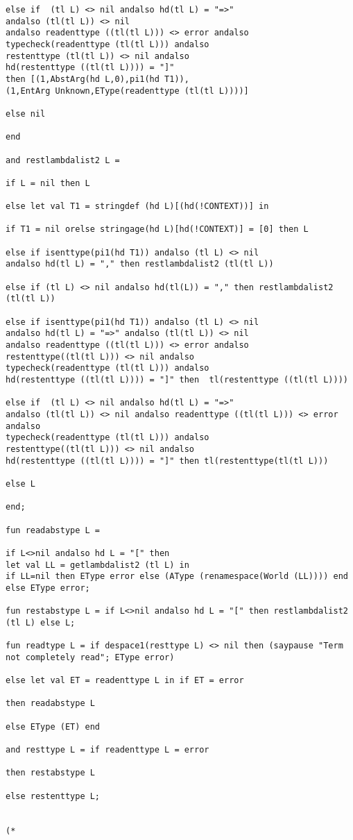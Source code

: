 \documentclass{article}
\begin{document}
\begin{verbatim}
else if  (tl L) <> nil andalso hd(tl L) = "=>" 
andalso (tl(tl L)) <> nil 
andalso readenttype ((tl(tl L))) <> error andalso
typecheck(readenttype (tl(tl L))) andalso
restenttype (tl(tl L)) <> nil andalso
hd(restenttype ((tl(tl L)))) = "]" 
then [(1,AbstArg(hd L,0),pi1(hd T1)),
(1,EntArg Unknown,EType(readenttype (tl(tl L))))]

else nil

end

and restlambdalist2 L =

if L = nil then L

else let val T1 = stringdef (hd L)[(hd(!CONTEXT))] in

if T1 = nil orelse stringage(hd L)[hd(!CONTEXT)] = [0] then L

else if isenttype(pi1(hd T1)) andalso (tl L) <> nil 
andalso hd(tl L) = "," then restlambdalist2 (tl(tl L))

else if (tl L) <> nil andalso hd(tl(L)) = "," then restlambdalist2 (tl(tl L))

else if isenttype(pi1(hd T1)) andalso (tl L) <> nil 
andalso hd(tl L) = "=>" andalso (tl(tl L)) <> nil 
andalso readenttype ((tl(tl L))) <> error andalso
restenttype((tl(tl L))) <> nil andalso
typecheck(readenttype (tl(tl L))) andalso
hd(restenttype ((tl(tl L)))) = "]" then  tl(restenttype ((tl(tl L))))

else if  (tl L) <> nil andalso hd(tl L) = "=>" 
andalso (tl(tl L)) <> nil andalso readenttype ((tl(tl L))) <> error andalso
typecheck(readenttype (tl(tl L))) andalso
restenttype((tl(tl L))) <> nil andalso
hd(restenttype ((tl(tl L)))) = "]" then tl(restenttype(tl(tl L)))

else L

end;

fun readabstype L = 

if L<>nil andalso hd L = "[" then 
let val LL = getlambdalist2 (tl L) in 
if LL=nil then EType error else (AType (renamespace(World (LL)))) end
else EType error;

fun restabstype L = if L<>nil andalso hd L = "[" then restlambdalist2 (tl L) else L;

fun readtype L = if despace1(resttype L) <> nil then (saypause "Term not completely read"; EType error)

else let val ET = readenttype L in if ET = error

then readabstype L

else EType (ET) end

and resttype L = if readenttype L = error

then restabstype L

else restenttype L;


(*

\end{verbatim}
\end{document}
